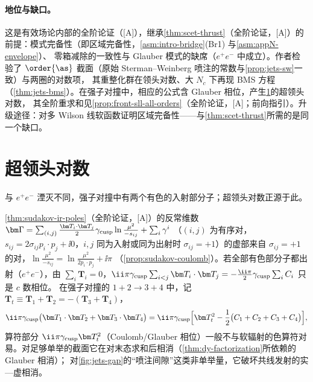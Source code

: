 \paragraph{地位与缺口。}
这是有效场论内部的全阶论证（[A]），继承\cref{thm:scet-thrust}（全阶论证，[A]）的前提：模式完备性（即区域完备性，\cref{asm:intro-bridge}(Br1) 与\cref{asm:appN-envelope}）、
零箱减除的一致性与 Glauber 模式的缺席（$e^+e^-$ 中成立）。作者检验了 $\order{\as}$ 截面（原始 Sterman--Weinberg 喷注的常数与\cref{prop:jets-sw}一致）与两圈的对数项，
其重整化群在领头对数、大 $N_c$ 下再现 BMS 方程（\cref{thm:jets-bms}）。在强子对撞中，相应的公式含 Glauber 相位，产生\cref{sec:jets-sll}的超领头对数，
其全阶重求和见\cref{prop:front-sll-all-orders}（全阶论证，[A]；前向指引）。升级途径：对多 Wilson 线软函数证明区域完备性——与\cref{thm:scet-thrust}所需的是同一个缺口。
\section{超领头对数}\label{sec:jets-sll}

与 $e^+e^-$ 湮灭不同，强子对撞中有两个有色的入射部分子；超领头对数正源于此。

\cref{thm:sudakov-ir-poles}（全阶论证，[A]）的反常维数 $\bm\Gamma=\sum_{(i,j)}\frac{\bm T_i\cdot\bm T_j}{2}\gamma_{\rm cusp}\ln\frac{\mu^2}{-s_{ij}}+\sum_i\gamma^i$
（$(i,j)$ 为有序对，$s_{ij}=2\sigma_{ij}p_i\cdot p_j+\ii0$，$i,j$ 同为入射或同为出射时 $\sigma_{ij}=+1$）的虚部来自 $\sigma_{ij}=+1$ 的对，$\ln\frac{\mu^2}{-s_{ij}}=\ln\frac{\mu^2}{2p_i\cdot p_j}+\ii\pi$
（\cref{prop:sudakov-coulomb}）。若全部有色部分子都出射（$e^+e^-$），由 $\sum_i\bm T_i=0$，$\ii\pi\gamma_{\rm cusp}\sum_{i<j}\bm T_i\cdot\bm T_j=-\frac{\ii\pi}{2}\gamma_{\rm cusp}\sum_iC_i$ 只是 $c$ 数相位。
在强子对撞的 $1+2\to3+4$ 中，记 $\bm T_t\equiv\bm T_1+\bm T_2=-(\bm T_3+\bm T_4)$，
\begin{equation}\label{eq:jets-coulomb-pp}
\ii\pi\gamma_{\rm cusp}\big(\bm T_1\cdot\bm T_2+\bm T_3\cdot\bm T_4\big)=\ii\pi\gamma_{\rm cusp}\Big[\bm T_t^2-\frac12\big(C_1+C_2+C_3+C_4\big)\Big],
\end{equation}
算符部分 $\ii\pi\gamma_{\rm cusp}\bm T_t^2$（Coulomb/Glauber 相位）一般不与软辐射的色算符对易。对足够单举的截面它在对末态求和后相消（\cref{thm:dy-factorization}所依赖的 Glauber 相消）；
对\cref{fig:jets-gap}的“喷注间隙”这类非单举量，它破坏共线发射的实—虚相消。

